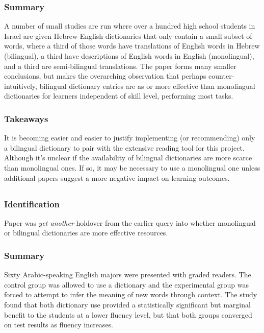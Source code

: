 \documentclass[
	letterpaper, %
]{jdf}
\begin{document}
\subsubsection{Summary}
A number of small studies are run where over a hundred high school students in Israel are given Hebrew-English dictionaries that only contain a small subset of words, where a third of those words have translations of English words in Hebrew (bilingual), a third have descriptions of English words in English (monolingual), and a third are semi-bilingual translations. The paper forms many smaller conclusions, but makes the overarching observation that perhaps counter-intuitively, bilingual dictionary entries are as or more effective than monolingual dictionaries for learners independent of skill level, performing most tasks.

\subsubsection{Takeaways}
It is becoming easier and easier to justify implementing (or recommending) only a bilingual dictionary to pair with the extensive reading tool for this project. Although it's unclear if the availability of bilingual dictionaries are more scarce than monolingual ones. If so, it may be necessary to use a monolingual one unless additional papers suggest a more negative impact on learning outcomes.

\subsection{}
\subsubsection{Identification}
Paper was \textit{yet another} holdover from the earlier query into whether monolingual or bilingual dictionaries are more effective resources.

\subsubsection{Summary}
Sixty Arabic-speaking English majors were presented with graded readers. The control group was allowed to use a dictionary and the experimental group was forced to attempt to infer the meaning of new words through context. The study found that both dictionary use provided a statistically significant but marginal benefit to the students at a lower fluency level, but that both groups converged on test results as fluency increases.
\end{document}
